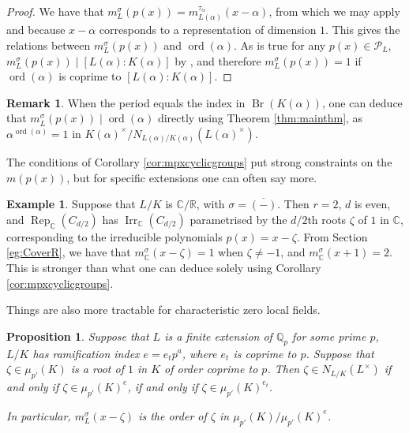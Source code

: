 \documentclass[10pt, reqno, hidelinks]{amsart}
\DeclareMathOperator{\Br}{Br}
\DeclareMathOperator{\Rep}{Rep}
\DeclareMathOperator{\ord}{ord}
\DeclareMathOperator{\Irr}{Irr}
\newcommand{\bC}{{\mathbb C}}
\newcommand{\bQ}{{\mathbb Q}}
\newcommand{\bR}{{\mathbb R}}
\newcommand{\sP}{{\mathcal P}}
\numberwithin{thm}{subsection}
\newtheorem{prop}[thm]{Proposition}
\theoremstyle{definition}
\newtheorem{eg}[thm]{Example}
\newtheorem{remark}[thm]{Remark}
\begin{document}
\begin{proof}
	We have that $m_L^{\sigma}(p(x)) = m_{L(\alpha)}^{\tau_{\alpha}}(x - \alpha)$, from which we may apply  \cite[Cor.\ 15.4]{TAYSchur} and \cite[Rem.\ 15.5]{TAYSchur} because $x - \alpha$ corresponds to a representation of dimension $1$. This gives the relations between $m_L^{\sigma}(p(x))$ and $\ord(\alpha)$. As is true for any $p(x) \in \sP_L$, $m_L^{\sigma}(p(x)) \mid [L(\alpha) : K(\alpha)]$ by \cite[Prop.\ 9.3(6)]{TAYSchur}, and therefore $m_L^{\sigma}(p(x)) = 1$ if $\ord(\alpha)$ is coprime to $[L(\alpha) : K(\alpha)]$.
\end{proof}

\begin{remark}
	When the period equals the index in $\Br(K(\alpha))$, one can deduce that $m_L^{\sigma}(p(x)) \mid \ord(\alpha)$ directly using Theorem \ref{thm:mainthm}, as $\alpha^{\ord(\alpha)} = 1$ in $K(\alpha)^{\times} / N_{L(\alpha) / K(\alpha)}(L(\alpha)^{\times})$.
\end{remark}

The conditions of Corollary \ref{cor:mpxcyclicgroups} put strong constraints on the $m(p(x))$, but for specific extensions one can often say more.

\begin{eg}
	Suppose that $L / K$ is $\bC / \bR$, with $\sigma = \overline{(-)}$. Then $r = 2$, $d$ is even, and $\Rep_{\bC}(C_{d/2})$ has $\Irr_{\bC}(C_{d/2})$ parametrised by the $d / 2$th roots $\zeta$ of $1$ in $\bC$, corresponding to the irreducible polynomials $p(x) = x - \zeta$. From Section \ref{eg:CoverR}, we have that $m_{\bC}^{\sigma}(x - \zeta) = 1$ when $\zeta \neq -1$, and $m_{\bC}^{\sigma}(x + 1) = 2$. This is stronger than what one can deduce solely using Corollary \ref{cor:mpxcyclicgroups}.
\end{eg}
	
	Things are also more tractable for characteristic zero local fields.
	
	\begin{prop}
		Suppose that $L$ is a finite extension of $\bQ_p$ for some prime $p$, $L / K$ has ramification index $e = e_t p^a$, where $e_t$ is coprime to $p$. Suppose that $\zeta \in \mu_{p'}(K)$ is a root of $1$ in $K$ of order coprime to $p$. Then $\zeta \in N_{L/K}(L^{\times})$ if and only if $\zeta \in \mu_{p'}(K)^e$, if and only if $\zeta \in \mu_{p'}(K)^{e_t}$.
        
        In particular, $m_L^{\sigma}(x - \zeta)$ is the order of $\zeta$ in $\mu_{p'}(K) / \mu_{p'}(K)^e$.
	\end{prop}
	
\end{document}
